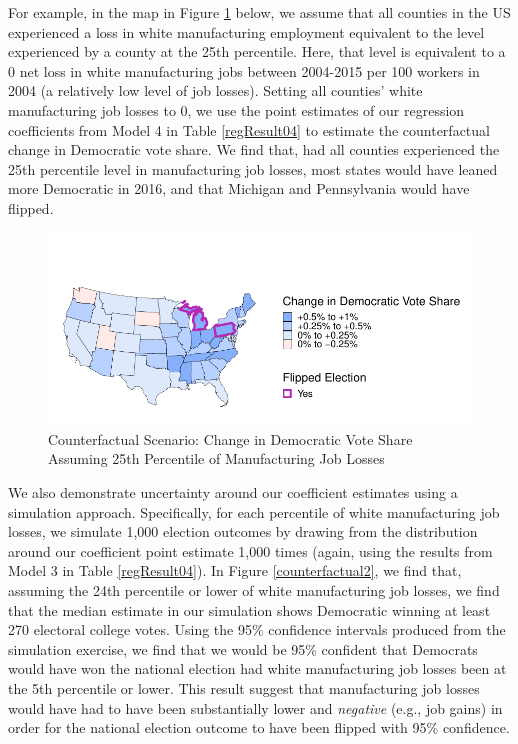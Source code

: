 \documentclass[]{AEA}
\begin{document}
For example, in the map in Figure \ref{counterfactual1} below, we assume
that all counties in the US experienced a loss in white manufacturing
employment equivalent to the level experienced by a county at the 25th
percentile. Here, that level is equivalent to a 0 net loss in white
manufacturing jobs between 2004-2015 per 100 workers in 2004 (a
relatively low level of job losses). Setting all counties' white
manufacturing job losses to 0, we use the point estimates of our
regression coefficients from Model 4 in Table \ref{regResult04} to
estimate the counterfactual change in Democratic vote share. We find
that, had all counties experienced the 25th percentile level in
manufacturing job losses, most states would have leaned more Democratic
in 2016, and that Michigan and Pennsylvania would have flipped.

\FloatBarrier
\begin{figure} \label{counterfactual1}
\caption{Counterfactual Scenario: Change in Democratic Vote Share Assuming 25th Percentile of Manufacturing Job Losses}

\begin{center}\includegraphics{Final-Draft_files/figure-latex/unnamed-chunk-6-1} \end{center}



\FloatBarrier
\end{figure}
\FloatBarrier

We also demonstrate uncertainty around our coefficient estimates using a
simulation approach. Specifically, for each percentile of white
manufacturing job losses, we simulate 1,000 election outcomes by drawing
from the distribution around our coefficient point estimate 1,000 times
(again, using the results from Model 3 in Table \ref{regResult04}). In
Figure \ref{counterfactual2}, we find that, assuming the 24th percentile
or lower of white manufacturing job losses, we find that the median
estimate in our simulation shows Democratic winning at least 270
electoral college votes. Using the 95\% confidence intervals produced
from the simulation exercise, we find that we would be 95\% confident
that Democrats would have won the national election had white
manufacturing job losses been at the 5th percentile or lower. This
result suggest that manufacturing job losses would have had to have been
substantially lower and \emph{negative} (e.g., job gains) in order for
the national election outcome to have been flipped with 95\% confidence.
\end{document}

